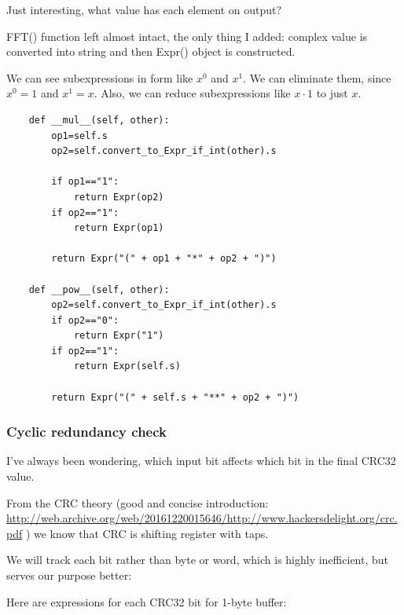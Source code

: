 

Just interesting, what value has each element on output?



FFT() function left almost intact, the only thing I added: complex value is converted into string and then
Expr() object is constructed.



We can see subexpressions in form like $x^0$ and $x^1$.
We can eliminate them, since $x^0=1$ and $x^1=x$.
Also, we can reduce subexpressions like $x \cdot 1$ to just $x$.

\begin{lstlisting}
    def __mul__(self, other):
        op1=self.s
        op2=self.convert_to_Expr_if_int(other).s

        if op1=="1":
            return Expr(op2)
        if op2=="1":
            return Expr(op1)

        return Expr("(" + op1 + "*" + op2 + ")")

    def __pow__(self, other):
        op2=self.convert_to_Expr_if_int(other).s
        if op2=="0":
            return Expr("1")
        if op2=="1":
            return Expr(self.s)

        return Expr("(" + self.s + "**" + op2 + ")")
\end{lstlisting}



\subsubsection{Cyclic redundancy check}

I've always been wondering, which input bit affects which bit in the final CRC32 value.

From the \ac{CRC} theory (good and concise introduction:
\url{http://web.archive.org/web/20161220015646/http://www.hackersdelight.org/crc.pdf}
) we know that \ac{CRC} is shifting register with taps.

We will track each bit rather than byte or word, which is highly inefficient, but serves our purpose better:



Here are expressions for each CRC32 bit for 1-byte buffer:



